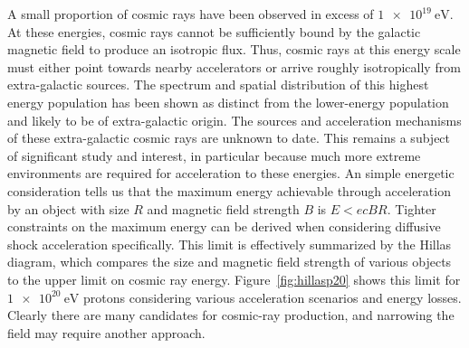A small proportion of cosmic rays have been observed in excess of $\SI{1e19}\eV$.
At these energies, cosmic rays cannot be sufficiently bound by the galactic magnetic field to produce an isotropic flux.
Thus, cosmic rays at this energy scale must either point towards nearby accelerators or arrive roughly isotropically from extra-galactic sources.
The spectrum and spatial distribution of this highest energy population has been shown as distinct from the lower-energy population and likely to be of extra-galactic origin.
The sources and acceleration mechanisms of these extra-galactic cosmic rays are unknown to date.
This remains a subject of significant study and interest, in particular because much more extreme environments are required for acceleration to these energies.
An simple energetic consideration tells us that the maximum energy achievable through acceleration by an object with size $R$ and magnetic field strength $B$ is $E<ecBR$.
Tighter constraints on the maximum energy can be derived when considering diffusive shock acceleration specifically.
This limit is effectively summarized by the Hillas diagram, which compares the size and magnetic field strength of various objects to the upper limit on cosmic ray energy.
Figure~\ref{fig:hillasp20} shows this limit for $\SI{1e20}\eV$ protons considering various acceleration scenarios and energy losses.
Clearly there are many candidates for cosmic-ray production, and narrowing the field may require another approach.

